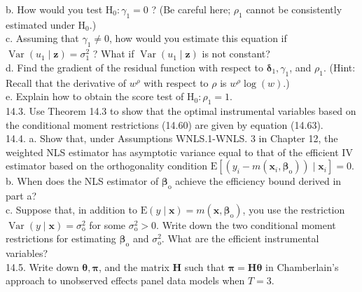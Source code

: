 \documentclass[10pt]{article}
\begin{document}
b. How would you test $\mathrm{H}_{0}: \gamma_{1}=0$ ? (Be careful here; $\rho_{1}$ cannot be consistently estimated under $\mathrm{H}_{0}$.)\\
c. Assuming that $\gamma_{1} \neq 0$, how would you estimate this equation if $\operatorname{Var}\left(u_{1} \mid \mathbf{z}\right)=\sigma_{1}^{2}$ ? What if $\operatorname{Var}\left(u_{1} \mid \mathbf{z}\right)$ is not constant?\\
d. Find the gradient of the residual function with respect to $\boldsymbol{\delta}_{1}, \gamma_{1}$, and $\rho_{1}$. (Hint: Recall that the derivative of $w^{\rho}$ with respect to $\rho$ is $w^{\rho} \log (w)$.)\\
e. Explain how to obtain the score test of $\mathrm{H}_{0}: \rho_{1}=1$.\\
14.3. Use Theorem 14.3 to show that the optimal instrumental variables based on the conditional moment restrictions (14.60) are given by equation (14.63).\\
14.4. a. Show that, under Assumptions WNLS.1-WNLS. 3 in Chapter 12, the weighted NLS estimator has asymptotic variance equal to that of the efficient IV estimator based on the orthogonality condition $\mathrm{E}\left[\left(y_{i}-m\left(\mathbf{x}_{i}, \boldsymbol{\beta}_{\mathrm{o}}\right)\right) \mid \mathbf{x}_{i}\right]=0$.\\
b. When does the NLS estimator of $\boldsymbol{\beta}_{\mathrm{o}}$ achieve the efficiency bound derived in part a?\\
c. Suppose that, in addition to $\mathrm{E}(y \mid \mathbf{x})=m\left(\mathbf{x}, \boldsymbol{\beta}_{\mathrm{o}}\right)$, you use the restriction $\operatorname{Var}(y \mid \mathbf{x}) =\sigma_{\mathrm{o}}^{2}$ for some $\sigma_{\mathrm{o}}^{2}>0$. Write down the two conditional moment restrictions for estimating $\boldsymbol{\beta}_{\mathrm{o}}$ and $\sigma_{\mathrm{o}}^{2}$. What are the efficient instrumental variables?\\
14.5. Write down $\boldsymbol{\theta}, \boldsymbol{\pi}$, and the matrix $\mathbf{H}$ such that $\boldsymbol{\pi}=\mathbf{H} \boldsymbol{\theta}$ in Chamberlain's approach to unobserved effects panel data models when $T=3$.\\
\end{document}
